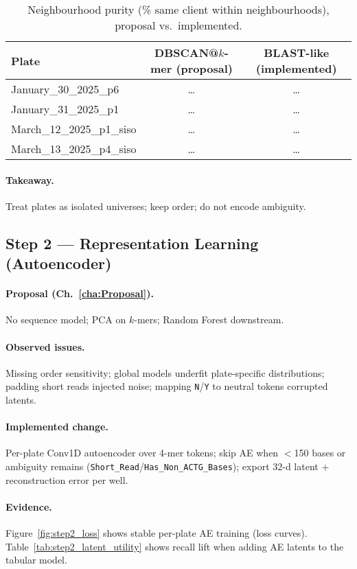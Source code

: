 \begin{table}[H]
\centering
\caption{Neighbourhood purity (\% same client within neighbourhoods), proposal vs.\ implemented.}
\label{tab:step1_purity}
\begin{tabular}{|l|c|c|}
\hline
\textbf{Plate} & \textbf{DBSCAN@$k$-mer (proposal)} & \textbf{BLAST-like (implemented)} \\\hline
January\_30\_2025\_p6  & \dots & \dots \\\hline
January\_31\_2025\_p1  & \dots & \dots \\\hline
March\_12\_2025\_p1\_siso & \dots & \dots \\\hline
March\_13\_2025\_p4\_siso & \dots & \dots \\\hline
\end{tabular}
\end{table}

\paragraph{Takeaway.} Treat plates as isolated universes; keep order; do not encode ambiguity.

\subsection*{Step 2 — Representation Learning (Autoencoder)}
\paragraph{Proposal (Ch.~\ref{cha:Proposal}).}
No sequence model; PCA on $k$-mers; Random Forest downstream.

\paragraph{Observed issues.}
Missing order sensitivity; global models underfit plate-specific distributions; padding short reads injected noise; mapping \texttt{N}/\texttt{Y} to neutral tokens corrupted latents.

\paragraph{Implemented change.}
Per-plate Conv1D autoencoder over 4-mer tokens; skip AE when $<$150 bases or ambiguity remains (\texttt{Short\_Read}/\texttt{Has\_Non\_ACTG\_Bases}); export 32-d latent + reconstruction error per well.

\paragraph{Evidence.}
Figure~\ref{fig:step2_loss} shows stable per-plate AE training (loss curves). 
Table~\ref{tab:step2_latent_utility} shows recall lift when adding AE latents to the tabular model.

